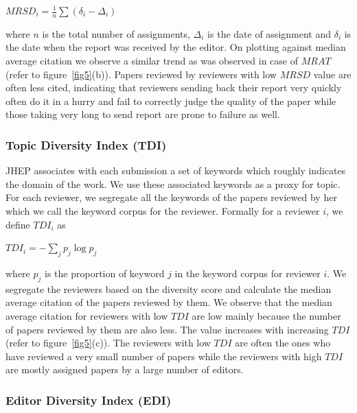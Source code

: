 \begin{center}
$MRSD_{i}=\frac{1}{n}\sum(\delta_{i}-\Delta_{i})$
\end{center}

where $n$ is the total number of assignments, $\Delta_{i}$ is the date of assignment and $\delta_{i}$ is the date when the report was received by the editor. On plotting against median average citation we observe a similar trend as was observed in case of $MRAT$ (refer to figure~\ref{fig5}(b)). Papers reviewed by reviewers with low $MRSD$ value are often less cited, indicating that reviewers sending back their report very quickly often do it in a hurry and fail to correctly judge the quality of the paper while those taking very long to send report are prone to failure as well. 

\subsubsection{Topic Diversity Index (TDI)}

JHEP associates with each submission a set of keywords which roughly indicates the domain of the work. We use these associated keywords as a proxy for topic. For each reviewer, we segregate all the keywords of the papers reviewed by her which we call the keyword corpus for the reviewer. Formally for a reviewer $i$, we define $TDI_{i}$ as 

\begin{center}
$TDI_{i}=-\sum \limits_{j} p_{j}\log p_{j}$
\end{center}

\noindent where $p_{j}$ is the proportion of keyword $j$ in the keyword corpus for reviewer $i$. We segregate the reviewers based on the diversity score and calculate the median average citation of the papers reviewed by them. We observe that the median average citation %
for reviewers with low $TDI$ are low mainly because the number of papers reviewed by them are also less. The value increases with  increasing $TDI$ (refer to figure~\ref{fig5}(c)). The reviewers with low $TDI$ are often the ones who have reviewed a very small number of papers while the reviewers with high $TDI$ are mostly assigned papers by a large number of editors. 
 
 
 
\subsubsection{Editor Diversity Index (EDI)}

